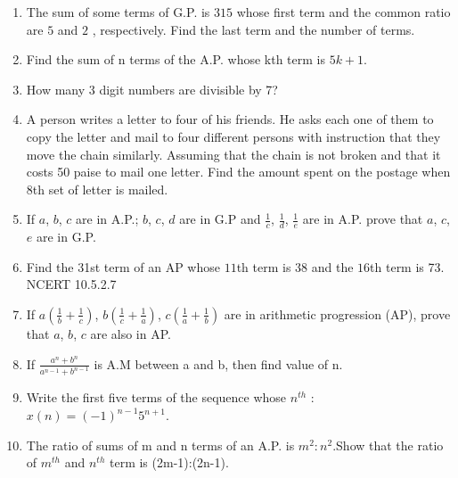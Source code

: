 \begin{enumerate}[label=\thesection.\arabic*,ref=\thesection.\theenumi]
\item The sum of some terms of G.P. is $315$ whose first term and the common ratio are $5$ and $2$ , respectively. Find the last term and the number of terms.\\
\solution


\item  Find the sum of n terms of the A.P. whose kth term is \(5k + 1\).\\
\solution

\item How many 3 digit numbers are divisible by 7? \\
\solution

\item A person writes a letter to four of his friends. He asks each one of them to copy the letter and mail to four different persons with instruction that they move the chain similarly. Assuming that the chain is not broken and that it costs 50 paise to mail one letter. Find the amount spent on the postage when 8th set of letter is mailed.\\
\solution 
\pagebreak

\item If $a$, $b$, $c$ are in A.P.; $b$, $c$, $d$ are in G.P and $\frac{1}{c}$, $\frac{1}{d}$, $\frac{1}{e}$ are in A.P. prove that $a$, $c$, $e$ are in G.P.\\
\solution
\pagebreak
\item Find the 31st term of an AP whose $11$th term is 38 and the $16$th term is 73.\\ \hfill{NCERT 10.5.2.7}
\\
\solution
\pagebreak
\item If $a\left(\frac{1}{b} + \frac{1}{c}\right)$, $b\left(\frac{1}{c} + \frac{1}{a}\right)$, $c\left(\frac{1}{a} + \frac{1}{b}\right)$ are in arithmetic progression (AP), prove that $a$, $b$, $c$ are also in AP. \\
\solution

\pagebreak
\item If \(\frac{a^n +b^n}{a^{n-1} + b^{n-1}}\) is A.M between a and b, then find value of n.\\
\solution
\pagebreak

\item Write the first five terms of the sequence whose $n^{th}$  : $x(n) = (-1)^{n-1}5^{n+1}$.\\
\solution
\pagebreak
\item The ratio of sums of m and n terms of an A.P. is $m^2:n^2$.Show
that the ratio of $m^{th}$ and $n^{th}$ term is (2m-1):(2n-1).\\
\solution
\pagebreak


\end{enumerate}
